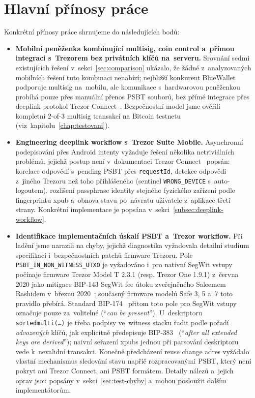 \section*{Hlavní přínosy práce}

Konkrétní přínosy práce shrnujeme do následujících bodů:

\begin{itemize}
\item \textbf{Mobilní peněženka kombinující multisig, coin control
  a~přímou integraci s~Trezorem bez privátních klíčů na~serveru.}
  Srovnání sedmi existujících řešení v~sekci~\ref{sec:comparison}
  ukázalo, že žádné z~analyzovaných mobilních řešení tuto kombinaci
  nenabízí; nejbližší konkurent BlueWallet~\cite{BlueWallet} podporuje
  multisig na~mobilu, ale komunikace s~hardwarovou peněženkou probíhá
  pouze přes manuální přenos PSBT souborů, bez přímé integrace přes
  deeplink protokol Trezor Connect~\cite{TrezorConnect}. Bezpečnostní
  model jsme ověřili kompletní 2-of-3 multisig transakcí na Bitcoin
  testnetu (viz~kapitolu~\ref{chap:testovani}).

\item \textbf{Engineering deeplink workflow s~Trezor Suite Mobile.}
  Asynchronní podepisování přes Android intenty vyžaduje řešení
  několika netriviálních problémů, jejichž postup není v~dokumentaci
  Trezor Connect~\cite{TrezorConnect} popsán: korelace odpovědí
  s~pending PSBT přes \texttt{requestId}, detekce odpovědi z~jiného
  Trezoru než toho přihlášeného (sentinel \texttt{WRONG\_DEVICE}
  s~auto-logoutem), rozlišení passphrase identity stejného fyzického
  zařízení podle fingerprintu xpub a~obnova stavu po~návratu uživatele
  z~aplikace třetí strany. Konkrétní implementace je popsána
  v~sekci~\ref{subsec:deeplink-workflow}.

\item \textbf{Identifikace implementačních úskalí PSBT a~Trezor
  workflow.} Při ladění jsme narazili na chyby, jejichž diagnostika
  vyžadovala detailní studium specifikací i~bezpečnostních patchů
  firmware Trezoru. Pole
  \texttt{PSBT\allowbreak \_\allowbreak IN\allowbreak \_\allowbreak NON\allowbreak \_\allowbreak WITNESS\allowbreak \_\allowbreak UTXO}
  je vyžadováno i~pro nativní SegWit vstupy počínaje firmware Trezor
  Model T 2.3.1 (resp. Trezor One 1.9.1) z~června 2020 jako mitigace
  BIP-143 SegWit fee útoku zveřejněného Saleemem Rashidem v~březnu
  2020~\cite{TrezorSegwitFix2020}; současný firmware modelů Safe 3, 5
  a~7 toto pravidlo přebírá. Standard BIP-174~\cite{BIP174} přitom
  toto pole pro SegWit vstupy označuje pouze za~volitelné
  (\enquote{\emph{can be present}}). U~deskriptoru
  \texttt{sortedmulti(\ldots)} je třeba podpisy ve~witness stacku
  řadit podle pořadí \emph{odvozených} klíčů, jak explicitně předepisuje
  BIP-383~\cite{BIP383} (\enquote{\emph{after all extended keys are
  derived}}); naivní seřazení xpubs jednou při parsování deskriptoru
  vede k~nevalidní transakci. Konečně předcházení reuse change adres
  vyžádalo vlastní mechanismus sledování stavu napříč rozpracovanými
  PSBT, který není pokryt ani Trezor Connect, ani PSBT formátem.
  Detaily nálezů a~jejich oprav jsou popsány v~sekci~\ref{sec:test-chyby}
  a~mohou posloužit dalším implementátorům.


\end{itemize}
